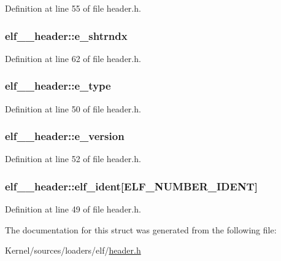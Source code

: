 Definition at line 55 of file header.h.

\hypertarget{structelf__32__header_a4c98bca5dcfaea4cb18b26ba8942af72}{
\subsubsection[{e\_\-shtrndx}]{ {\bf elf\_\_\-header::e\_\-shtrndx}}}
\label{structelf__32__header_a4c98bca5dcfaea4cb18b26ba8942af72}


Definition at line 62 of file header.h.

\hypertarget{structelf__32__header_a9b5c0b9a83cd0c472290a81676b4119f}{
\subsubsection[{e\_\-type}]{ {\bf elf\_\_\-header::e\_\-type}}}
\label{structelf__32__header_a9b5c0b9a83cd0c472290a81676b4119f}


Definition at line 50 of file header.h.

\hypertarget{structelf__32__header_ab8b2dd687058469e74ec1cda4e924add}{
\subsubsection[{e\_\-version}]{ {\bf elf\_\_\-header::e\_\-version}}}
\label{structelf__32__header_ab8b2dd687058469e74ec1cda4e924add}


Definition at line 52 of file header.h.

\hypertarget{structelf__32__header_ad6b49380ff71793547a712aa8d24c5fe}{
\subsubsection[{elf\_\-ident}]{ {\bf elf\_\_\-header::elf\_\-ident}\mbox{[}ELF\_\-NUMBER\_\-IDENT\mbox{]}}}
\label{structelf__32__header_ad6b49380ff71793547a712aa8d24c5fe}


Definition at line 49 of file header.h.



The documentation for this struct was generated from the following file:\begin{DoxyCompactItemize}
\item 
Kernel/sources/loaders/elf/\hyperlink{header_8h}{header.h}\end{DoxyCompactItemize}
